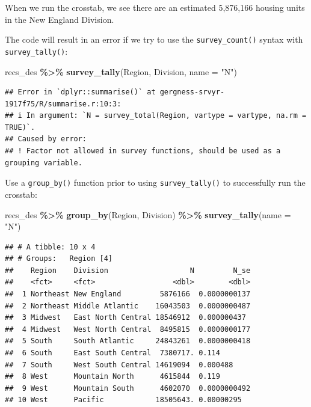 \documentclass[
]{krantz}
\makeatletter
\newenvironment{Shaded}{\begin{snugshade}}{\end{snugshade}}
\newcommand{\AttributeTok}[1]{\textcolor[rgb]{0.27,0.27,0.27}{#1}}
\newcommand{\FunctionTok}[1]{\textcolor[rgb]{0.27,0.27,0.27}{\textbf{#1}}}
\newcommand{\NormalTok}[1]{#1}
\newcommand{\SpecialCharTok}[1]{\textcolor[rgb]{0.43,0.43,0.43}{\textbf{#1}}}
\newcommand{\StringTok}[1]{\textcolor[rgb]{0.5,0.5,0.5}{#1}}
\newenvironment{kframe}{%
\medskip{}
\setlength{\fboxsep}{.8em}
 \def\at@end@of@kframe{}%
 \ifinner\ifhmode%
  \def\at@end@of@kframe{\end{minipage}}%
  \begin{minipage}{\columnwidth}%
 \fi\fi%
 \def\FrameCommand##1{\hskip\@totalleftmargin \hskip-\fboxsep
 \colorbox{shadecolor}{##1}\hskip-\fboxsep
     \hskip-\linewidth \hskip-\@totalleftmargin \hskip\columnwidth}%
 \MakeFramed {\advance\hsize-\width
   \@totalleftmargin\z@ \linewidth\hsize
   \@setminipage}}%
 {\par\unskip\endMakeFramed%
 \at@end@of@kframe}
\renewenvironment{Shaded}{\begin{kframe}}{\end{kframe}}
\makeatother
\begin{document}
When we run the crosstab, we see there are an estimated 5,876,166 housing units in the New England Division.

The code will result in an error if we try to use the \texttt{survey\_count()} syntax with \texttt{survey\_tally()}:

\begin{Shaded}
\begin{Highlighting}[]
\NormalTok{recs\_des }\SpecialCharTok{\%\textgreater{}\%}
  \FunctionTok{survey\_tally}\NormalTok{(Region, Division, }\AttributeTok{name =} \StringTok{"N"}\NormalTok{)}
\end{Highlighting}
\end{Shaded}

\begin{verbatim}
## Error in `dplyr::summarise()` at gergness-srvyr-1917f75/R/summarise.r:10:3:
## i In argument: `N = survey_total(Region, vartype = vartype, na.rm = TRUE)`.
## Caused by error:
## ! Factor not allowed in survey functions, should be used as a grouping variable.
\end{verbatim}

Use a \texttt{group\_by()} function prior to using \texttt{survey\_tally()} to successfully run the crosstab:

\begin{Shaded}
\begin{Highlighting}[]
\NormalTok{recs\_des }\SpecialCharTok{\%\textgreater{}\%}
  \FunctionTok{group\_by}\NormalTok{(Region, Division) }\SpecialCharTok{\%\textgreater{}\%}
  \FunctionTok{survey\_tally}\NormalTok{(}\AttributeTok{name =} \StringTok{"N"}\NormalTok{)}
\end{Highlighting}
\end{Shaded}

\begin{verbatim}
## # A tibble: 10 x 4
## # Groups:   Region [4]
##    Region    Division                   N         N_se
##    <fct>     <fct>                  <dbl>        <dbl>
##  1 Northeast New England         5876166  0.0000000137
##  2 Northeast Middle Atlantic    16043503  0.0000000487
##  3 Midwest   East North Central 18546912  0.000000437 
##  4 Midwest   West North Central  8495815  0.0000000177
##  5 South     South Atlantic     24843261  0.0000000418
##  6 South     East South Central  7380717. 0.114       
##  7 South     West South Central 14619094  0.000488    
##  8 West      Mountain North      4615844  0.119       
##  9 West      Mountain South      4602070  0.0000000492
## 10 West      Pacific            18505643. 0.00000295
\end{verbatim}
\end{document}
